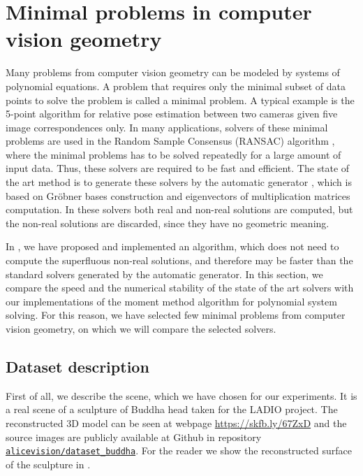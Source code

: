 \chapter{Minimal problems in computer vision geometry}
Many problems from computer vision geometry can be modeled by systems of polynomial equations.
A problem that requires only the minimal subset of data points to solve the problem is called a minimal problem.
A typical example is the 5-point algorithm \cite{5pt} for relative pose estimation between two cameras given five image correspondences only.
In many applications, solvers of these minimal problems are used in the Random Sample Consensus (RANSAC) algorithm \cite{ransac}, where the minimal problems has to be solved repeatedly for a large amount of input data.
Thus, these solvers are required to be fast and efficient.
The state of the art method is to generate these solvers by the automatic generator \cite{autogen}, which is based on Gr\"obner bases construction and eigenvectors of multiplication matrices computation.
In these solvers both real and non-real solutions are computed, but the non-real solutions are discarded, since they have no geometric meaning.

In , we have proposed and implemented an algorithm, which does not need to compute the superfluous non-real solutions, and therefore may be faster than the standard solvers generated by the automatic generator.
In this section, we compare the speed and the numerical stability of the state of the art solvers with our implementations of the moment method algorithm for polynomial system solving.
For this reason, we have selected few minimal problems from computer vision geometry, on which we will compare the selected solvers.

\section{Dataset description}

First of all, we describe the scene, which we have chosen for our experiments.
It is a real scene of a sculpture of Buddha head taken for the LADIO \cite{ladio} project.
The reconstructed 3D model can be seen at webpage \url{https://skfb.ly/67ZxD} and the source images are publicly available at Github in repository \href{https://github.com/alicevision/dataset\_buddha}{\nolinkurl{alicevision/dataset\_buddha}}.
For the reader we show the reconstructed surface of the sculpture in .

